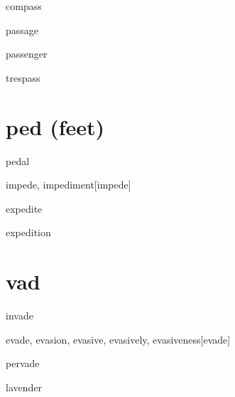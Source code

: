 \begin{wordRef}{compass}
\end{wordRef}

\begin{wordRef}{passage}
\end{wordRef}

\begin{wordRef}{passenger}
\end{wordRef}

\begin{wordRef}{trespass}
\end{wordRef}

\section{ped (feet)}

\begin{wordRef}{pedal}
\end{wordRef}

\begin{wordRef}{impede, impediment}[impede]
\end{wordRef}

\begin{wordRef}{expedite}
\end{wordRef}

\begin{wordRef}{expedition}
\end{wordRef}

\section{vad}

\begin{wordRef}{invade}
\end{wordRef}

\begin{wordRef}{evade, evasion, evasive, evasively, evasiveness}[evade]
\end{wordRef}

\begin{wordRef}{pervade}
\end{wordRef}

\begin{wordRef}{lavender}
\end{wordRef}